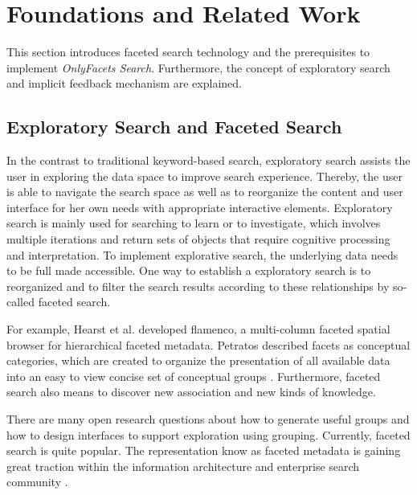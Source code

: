 
\chapter{Foundations and Related Work}

This section introduces faceted search technology and the prerequisites to implement {\it OnlyFacets Search}. Furthermore, the concept of exploratory search and implicit feedback mechanism are explained.

\section{Exploratory Search and Faceted Search}

In the contrast to traditional keyword-based search, exploratory search assists the user in exploring the data space to improve search experience. Thereby, the user is able to navigate the search space as well as to reorganize the content and user interface for her own needs with appropriate interactive elements. Exploratory search is mainly used for searching to learn or to investigate, which involves multiple iterations and return sets of objects that require cognitive processing and interpretation\cite{Marchionini2006}. To implement explorative search, the underlying data needs to be full made accessible. One way to establish a exploratory search is to reorganized and to filter the search results according to these relationships by so-called faceted search.

For example, Hearst et al. developed flamenco, a multi-column faceted spatial browser for hierarchical faceted metadata\cite{Hearst2006}. Petratos described facets as conceptual categories, which are created to organize the presentation of all available data into an easy to view concise set of conceptual groups \cite{Petratos2008}. Furthermore, faceted search also means to discover new association and new kinds of knowledge.

There are many open research questions about how to generate useful groups and how to design interfaces to support exploration using grouping. Currently, faceted search is quite popular.  The representation know as faceted metadata is gaining great traction within the information architecture and enterprise search community \cite{Yee2003}.


